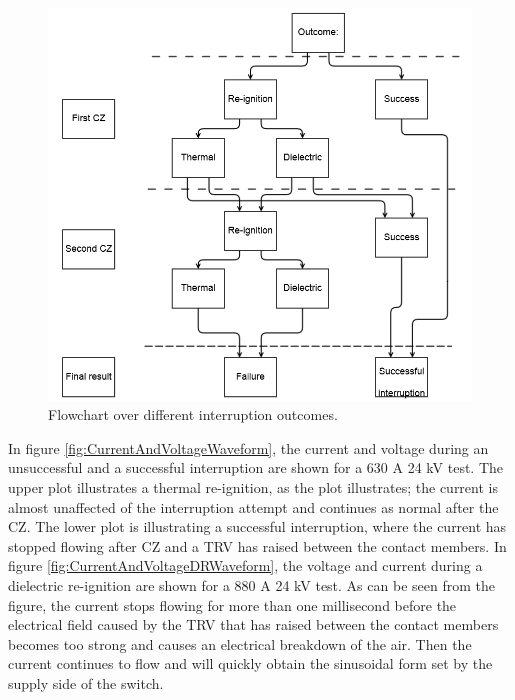 \documentclass[10pt,b5paper,twoside]{article}
\begin{document}
\begin{figure} [H]
\centering
\includegraphics[scale=0.60]{Bilder/Results/outcomeinterruption.png}
\caption{Flowchart over different interruption outcomes.} \label{fig:flowchart}
\end{figure}

In figure \ref{fig:CurrentAndVoltageWaveform}, the current and voltage during an unsuccessful and a successful interruption are shown for a 630 A 24 kV test. The upper plot illustrates a thermal re-ignition, as the plot illustrates; the current is almost unaffected of the interruption attempt and continues as normal after the CZ. The lower plot is illustrating a successful interruption, where the current has stopped flowing after CZ and a TRV has raised between the contact members. In figure \ref{fig:CurrentAndVoltageDRWaveform}, the voltage and current during a dielectric re-ignition are shown for a 880 A 24 kV test. As can be seen from the figure, the current stops flowing for more than one millisecond before the electrical field caused by the TRV that has raised between the contact members becomes too strong and causes an electrical breakdown of the air. Then the current continues to flow and will quickly obtain the sinusoidal form set by the supply side of the switch. 
\end{document}
